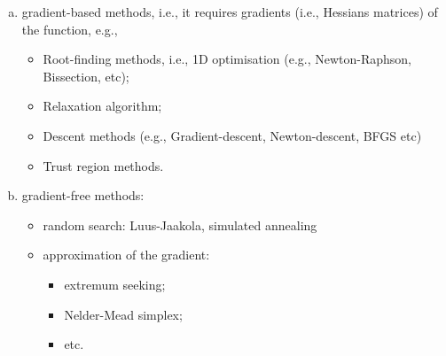    \begin{enumerate}[a)]
      \item gradient-based methods, i.e., it requires gradients (i.e., Hessians matrices) of the function, e.g.,
          \begin{itemize}
             \item Root-finding methods, i.e., 1D optimisation (e.g., Newton-Raphson, Bissection, etc);
             \item Relaxation algorithm;
             \item Descent methods (e.g., Gradient-descent, Newton-descent, BFGS etc)
             \item Trust region methods.
          \end{itemize}
      \item gradient-free methods:
          \begin{itemize}
             \item random search: Luus-Jaakola, simulated annealing
             \item approximation of the gradient:
                 \begin{itemize}
                     \item extremum seeking;
                     \item Nelder-Mead simplex;
                     \item etc.
                 \end{itemize}
          \end{itemize}
   \end{enumerate}


